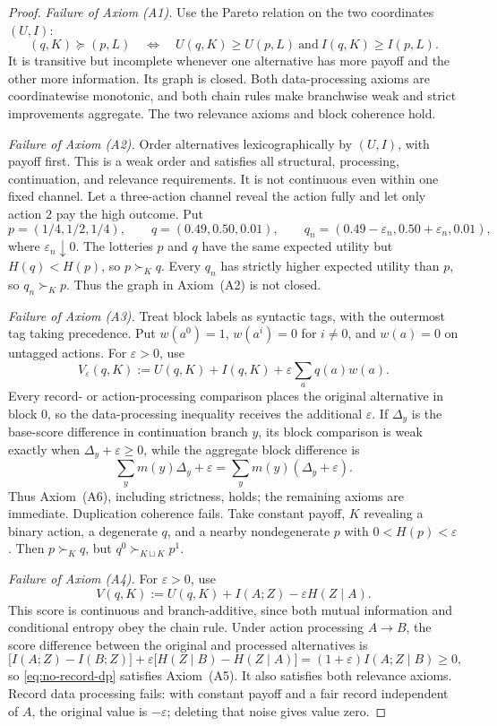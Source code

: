 \documentclass[11pt,a4paper]{article}
\theoremstyle{definition}
\newcommand{\Sh}{H}
\newcommand{\1}{\mathbf 1}
\begin{document}
\begin{proof}
\emph{Failure of Axiom \textup{(A1)}.}
Use the Pareto relation on the two coordinates $(U,I)$:
\[
 (q,K)\succeq(p,L)
 \quad\Longleftrightarrow\quad
 U(q,K)\ge U(p,L)\ \text{and}\ I(q,K)\ge I(p,L).
\]
It is transitive but incomplete whenever one alternative has more payoff and the other more information.  Its graph is
closed.  Both data-processing axioms are coordinatewise monotonic, and both chain rules make branchwise weak and strict
improvements aggregate.  The two relevance axioms and block coherence hold.

\emph{Failure of Axiom \textup{(A2)}.}
Order alternatives lexicographically by $(U,I)$, with payoff first.  This is a weak order and satisfies all structural,
processing, continuation, and relevance requirements.  It is not continuous even within one fixed channel.  Let a
three-action channel reveal the action fully and let only action $2$ pay the high outcome.  Put
\[
 p=(1/4,1/2,1/4),\qquad q=(0.49,0.50,0.01),\qquad
 q_n=(0.49-\varepsilon_n,0.50+\varepsilon_n,0.01),
\]
where $\varepsilon_n\downarrow0$.  The lotteries $p$ and $q$ have the same expected utility but
$\Sh(q)<\Sh(p)$, so $p\succ_Kq$.  Every $q_n$ has strictly higher expected utility than $p$, so
$q_n\succ_Kp$.  Thus the graph in Axiom~\textup{(A2)} is not closed.

\emph{Failure of Axiom \textup{(A3)}.}
Treat block labels as syntactic tags, with the outermost tag taking precedence.  Put $w(a^0)=1$, $w(a^i)=0$ for
$i\ne0$, and $w(a)=0$ on untagged actions.  For $\varepsilon>0$, use
\[
 V_\varepsilon(q,K):=U(q,K)+I(q,K)+\varepsilon\sum_aq(a)w(a).
\]
Every record- or action-processing comparison places the original alternative in block $0$, so the data-processing
inequality receives the additional $\varepsilon$.  If $\Delta_y$ is the base-score difference in continuation branch
$y$, its block comparison is weak exactly when $\Delta_y+\varepsilon\ge0$, while the aggregate block difference is
\[
 \sum_y m(y)\Delta_y+\varepsilon
 =\sum_y m(y)(\Delta_y+\varepsilon).
\]
Thus Axiom~\textup{(A6)}, including strictness, holds; the remaining axioms are immediate.  Duplication coherence fails.
Take constant payoff, $K$ revealing a binary action, a degenerate $q$, and a nearby nondegenerate $p$ with
$0<\Sh(p)<\varepsilon$.  Then $p\succ_Kq$, but $q^0\succ_{K\sqcup K}p^1$.

\emph{Failure of Axiom \textup{(A4)}.}
For $\varepsilon>0$, use
\begin{equation}
 V(q,K):=U(q,K)+I(A;Z)-\varepsilon\Sh(Z\mid A).
 \label{eq:no-record-dp}
\end{equation}
This score is continuous and branch-additive, since both mutual information and conditional entropy obey the chain
rule.  Under action processing $A\to B$, the score difference between the original and processed alternatives is
\[
 \bigl[I(A;Z)-I(B;Z)\bigr]
 +\varepsilon\bigl[\Sh(Z\mid B)-\Sh(Z\mid A)\bigr]
 =(1+\varepsilon)I(A;Z\mid B)\ge0,
\]
so \eqref{eq:no-record-dp} satisfies Axiom~\textup{(A5)}.  It also satisfies both relevance axioms.  Record data
processing fails: with constant payoff and a fair record independent of $A$, the original value is $-\varepsilon$;
deleting that noise gives value zero.


\end{proof}
\end{document}
